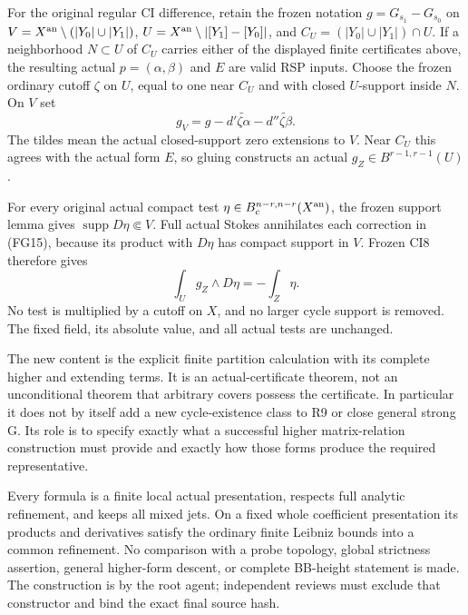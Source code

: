 For the original regular CI difference, retain the frozen notation
$g=G_{s_1}-G_{s_0}$ on $V=X^{\rm an}\setminus(|Y_0|\cup|Y_1|)$,
$U=X^{\rm an}\setminus|[Y_1]-[Y_0]|$, and
$C_U=(|Y_0|\cup|Y_1|)\cap U$.  If a neighborhood $N\subset U$
of $C_U$ carries either of the displayed finite certificates above,
the resulting actual $p=(\alpha,\beta)$ and $E$ are valid RSP inputs.
Choose the frozen ordinary cutoff $\zeta$ on $U$, equal to one near
$C_U$ and with closed $U$-support inside $N$.  On $V$ set
\[
 g_V=g-d'\widetilde{\zeta\alpha}-d''\widetilde{\zeta\beta}.
                                                                  \tag{FG15}
\]
The tildes mean the actual closed-support zero extensions to $V$.
Near $C_U$ this agrees with the actual form $E$, so gluing constructs
an actual $g_Z\in B^{r-1,r-1}(U)$.

For every original actual compact test
$\eta\in B_c^{n-r,n-r}(X^{\rm an})$, the frozen support lemma gives
$\operatorname{supp}D\eta\Subset V$.  Full actual Stokes annihilates
each correction in (FG15), because its product with $D\eta$ has
compact support in $V$.  Frozen CI8 therefore gives
\[
                    \int_U g_Z\wedge D\eta=-\int_Z\eta.
                                                                  \tag{FG16}
\]
No test is multiplied by a cutoff on $X$, and no larger cycle support
is removed.  The fixed field, its absolute value, and all actual
tests are unchanged.

The new content is the explicit finite partition calculation with
its complete higher and extending terms.  It is an actual-certificate
theorem, not an unconditional theorem that arbitrary covers possess
the certificate.  In particular it does not by itself add a new
cycle-existence class to R9 or close general strong G.  Its role is
to specify exactly what a successful higher matrix-relation
construction must provide and exactly how those forms produce the
required representative.

Every formula is a finite local actual presentation, respects full
analytic refinement, and keeps all mixed jets.  On a fixed whole
coefficient presentation its products and derivatives satisfy the
ordinary finite Leibniz bounds into a common refinement.  No
comparison with a probe topology, global strictness assertion,
general higher-form descent, or complete BB-height statement is
made.  The construction is by the root agent; independent reviews
must exclude that constructor and bind the exact final source hash.
